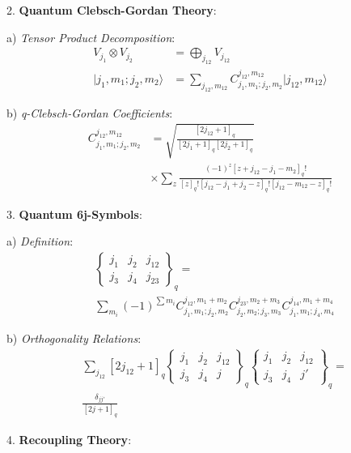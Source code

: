 \documentclass[12pt,a4paper]{article}
\begin{document}
2. \textbf{Quantum Clebsch-Gordan Theory}:
   
   a) \textit{Tensor Product Decomposition}:
      \[
      \begin{aligned}
      V_{j_1} \otimes V_{j_2} &= \bigoplus_{j_{12}} V_{j_{12}} \\
      |j_1,m_1;j_2,m_2\rangle &= \sum_{j_{12},m_{12}} C^{j_{12},m_{12}}_{j_1,m_1;j_2,m_2}|j_{12},m_{12}\rangle
      \end{aligned}
      \]
   
   b) \textit{q-Clebsch-Gordan Coefficients}:
      \[
      \begin{aligned}
      C^{j_{12},m_{12}}_{j_1,m_1;j_2,m_2} &= \sqrt{\frac{[2j_{12}+1]_q}{[2j_1+1]_q[2j_2+1]_q}} \\
      &\times \sum_z \frac{(-1)^z[z+j_{12}-j_1-m_2]_q!}{[z]_q![j_{12}-j_1+j_2-z]_q![j_{12}-m_{12}-z]_q!}
      \end{aligned}
      \]

3. \textbf{Quantum 6j-Symbols}:
   
   a) \textit{Definition}:
      \[
      \begin{aligned}
      &\begin{Bmatrix} j_1 & j_2 & j_{12} \\ j_3 & j_4 & j_{23} \end{Bmatrix}_q = \\
      &\sum_{m_i} (-1)^{\sum m_i} C^{j_{12},m_1+m_2}_{j_1,m_1;j_2,m_2} C^{j_{23},m_2+m_3}_{j_2,m_2;j_3,m_3} C^{j_{14},m_1+m_4}_{j_1,m_1;j_4,m_4}
      \end{aligned}
      \]
   
   b) \textit{Orthogonality Relations}:
      \[
      \begin{aligned}
      &\sum_{j_{12}} [2j_{12}+1]_q \begin{Bmatrix} j_1 & j_2 & j_{12} \\ j_3 & j_4 & j \end{Bmatrix}_q \begin{Bmatrix} j_1 & j_2 & j_{12} \\ j_3 & j_4 & j' \end{Bmatrix}_q = \\
      &\frac{\delta_{jj'}}{[2j+1]_q}
      \end{aligned}
      \]

4. \textbf{Recoupling Theory}:
   
\end{document}
